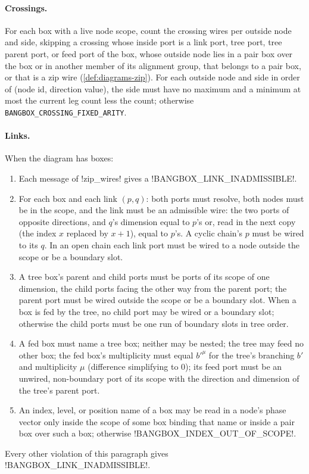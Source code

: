 \paragraph{Crossings.} For each box with a live node scope, count the crossing wires per outside node and side, skipping a crossing whose inside port is a link port, tree port, tree parent port, or feed port of the box, whose outside node lies in a pair box over the box or in another member of its alignment group, that belongs to a pair box, or that is a zip wire (\cref{def:diagrams-zip}). For each outside node and side in order of (node id, direction value), the side must have no maximum and a minimum at most the current leg count less the count; otherwise \texttt{BANGBOX\_CROSSING\_FIXED\_ARITY}.

\paragraph{Links.} When the diagram has boxes:
\begin{enumerate}
\item Each message of \py!zip_wires! gives a \code!BANGBOX_LINK_INADMISSIBLE!.
\item For each box and each link $(p,q)$: both ports must resolve, both nodes must be in the scope, and the link must be an admissible wire: the two ports of opposite directions, and $q$'s dimension equal to $p$'s or, read in the next copy (the index $x$ replaced by $x+1$), equal to $p$'s. A cyclic chain's $p$ must be wired to its $q$. In an open chain each link port must be wired to a node outside the scope or be a boundary slot.
\item A tree box's parent and child ports must be ports of its scope of one dimension, the child ports facing the other way from the parent port; the parent port must be wired outside the scope or be a boundary slot. When a box is fed by the tree, no child port may be wired or a boundary slot; otherwise the child ports must be one run of boundary slots in tree order.
\item A fed box must name a tree box; neither may be nested; the tree may feed no other box; the fed box's multiplicity must equal $b'^{\mu}$ for the tree's branching $b'$ and multiplicity $\mu$ (difference simplifying to $0$); its feed port must be an unwired, non-boundary port of its scope with the direction and dimension of the tree's parent port.
\item An index, level, or position name of a box may be read in a node's phase vector only inside the scope of some box binding that name or inside a pair box over such a box; otherwise \code!BANGBOX_INDEX_OUT_OF_SCOPE!.
\end{enumerate}
Every other violation of this paragraph gives \code!BANGBOX_LINK_INADMISSIBLE!.

